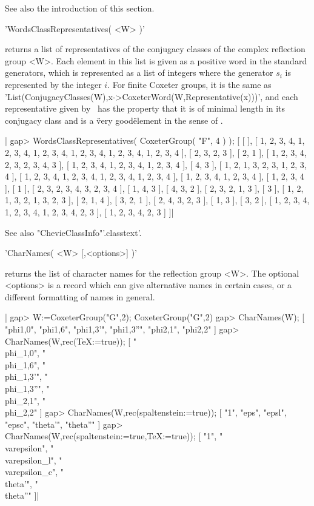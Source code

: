 See also the introduction of this section.


'WordsClassRepresentatives( <W> )'

returns  a list of representatives of  the conjugacy classes of the complex
reflection group <W>. Each element in this list is given as a positive word
in  the standard  generators, which  is represented  as a  list of integers
where  the generator  $s_i$ is  represented by  the integer $i$. For finite
Coxeter groups, it is the same as
'List(ConjugacyClasses(W),x->CoxeterWord(W,Representative(x)))',  and  each
representative  given by  \CHEVIE\ has  the property  that it is of minimal
length  in its conjugacy class and is  a \"very good\" element in the sense
of \cite{GM97}.

|    gap> WordsClassRepresentatives( CoxeterGroup( "F", 4 ) );
    [ [  ],
      [ 1, 2, 3, 4, 1, 2, 3, 4, 1, 2, 3, 4, 1, 2, 3, 4, 1, 2, 3, 4, 1, 2,
          3, 4 ], [ 2, 3, 2, 3 ], [ 2, 1 ],
      [ 1, 2, 3, 4, 2, 3, 2, 3, 4, 3 ],
      [ 1, 2, 3, 4, 1, 2, 3, 4, 1, 2, 3, 4 ], [ 4, 3 ],
      [ 1, 2, 1, 3, 2, 3, 1, 2, 3, 4 ],
      [ 1, 2, 3, 4, 1, 2, 3, 4, 1, 2, 3, 4, 1, 2, 3, 4 ],
      [ 1, 2, 3, 4, 1, 2, 3, 4 ], [ 1, 2, 3, 4 ], [ 1 ],
      [ 2, 3, 2, 3, 4, 3, 2, 3, 4 ], [ 1, 4, 3 ], [ 4, 3, 2 ],
      [ 2, 3, 2, 1, 3 ], [ 3 ], [ 1, 2, 1, 3, 2, 1, 3, 2, 3 ],
      [ 2, 1, 4 ], [ 3, 2, 1 ], [ 2, 4, 3, 2, 3 ], [ 1, 3 ], [ 3, 2 ],
      [ 1, 2, 3, 4, 1, 2, 3, 4, 1, 2, 3, 4, 2, 3 ], [ 1, 2, 3, 4, 2, 3 ] ]|

See also "ChevieClassInfo"'.classtext'.


'CharNames( <W> [,<options>] )'

returns  the  list  of  character  names  for the reflection group <W>. The
optional  <options> is a record which can give alternative names in certain
cases, or a different formatting of names in general.

|    gap> W:=CoxeterGroup("G",2);
    CoxeterGroup("G",2)
    gap> CharNames(W);
    [ "phi{1,0}", "phi{1,6}", "phi{1,3}'", "phi{1,3}''", "phi{2,1}",
      "phi{2,2}" ]
    gap> CharNames(W,rec(TeX:=true));
    [ "\\phi_{1,0}", "\\phi_{1,6}", "\\phi_{1,3}'", "\\phi_{1,3}''",
      "\\phi_{2,1}", "\\phi_{2,2}" ]
    gap> CharNames(W,rec(spaltenstein:=true));
    [ "1", "eps", "epsl", "epsc", "theta'", "theta''" ]
    gap> CharNames(W,rec(spaltenstein:=true,TeX:=true));
    [ "1", "\\varepsilon", "\\varepsilon_l", "\\varepsilon_c",
      "\\theta'", "\\theta''" ]|

